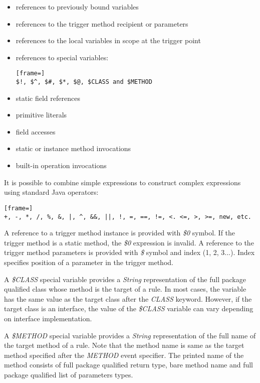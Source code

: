 \documentclass[12pt,oneside]{fithesis2}
\begin{document}
\begin{itemize}
	\item references to previously bound variables
	\item references to the trigger method recipient or parameters
	\item references to the local variables in scope at the trigger point
	\item references to special variables:
\begin{lstlisting}[frame=]
$!, $^, $#, $*, $@, $CLASS and $METHOD
\end{lstlisting}
	\item static field references
	\item primitive literals
	\item field accesses
	\item static or instance method invocations
	\item built-in operation invocations
\end{itemize}

It is possible to combine simple expressions to construct complex expressions using standard Java operators:
\begin{lstlisting}[frame=]
+, -, *, /, %, &, |, ^, &&, ||, !, =, ==, !=, <. <=, >, >=, new, etc.
\end{lstlisting}

A reference to a trigger method instance is provided with \textit{\$0} symbol. If the trigger method is a static method, the \textit{\$0} expression is invalid. A reference to the trigger method parameters is provided with \textit{\$} symbol and index (1, 2, 3...). Index specifies position of a parameter in the trigger method.

A \textit{\$CLASS} special variable provides a \textit{String} representation of the full package qualified class whose method is the target of a rule. In most cases, the variable has the same value as the target class after the \textit{CLASS} keyword. However, if the target class is an interface, the value of the \textit{\$CLASS} variable can vary depending on interface implementation.

A \textit{\$METHOD} special variab\cite[Rule actions]{byteman_doc}le provides a \textit{String} representation of the full name of the target method of a rule. Note that the method name is same as the target method specified after the \textit{METHOD} event specifier. The printed name of the method consists of full package qualified return type, bare method name and full package qualified list of parameters types.
\end{document}
